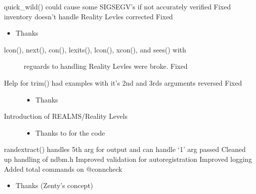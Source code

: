 \documentclass[letterpaper,10pt,english]{sphinxmanual}
\begin{document}
\sphinxAtStartPar
quick\_wild() could cause some SIGSEGV’s if not accurately verified \sphinxhyphen{} Fixed
inventory doesn’t handle Reality Levles corrected \sphinxhyphen{} Fixed
\begin{itemize}
\item {} 
\sphinxAtStartPar
Thanks 

\end{itemize}
\begin{description}
\item[{lcon(), next(), con(), lexits(), lcon(), xcon(), and sees() with}] \leavevmode
\sphinxAtStartPar
reguards to handling Reality Levles were broke. \sphinxhyphen{} Fixed

\item[{Help for trim() had examples with it’s 2nd and 3rds arguments reversed \sphinxhyphen{} Fixed}] \leavevmode\begin{itemize}
\item {} 
\sphinxAtStartPar
Thanks 

\end{itemize}

\end{description}
\begin{description}
\item[{Introduction of REALMS/Reality Levels}] \leavevmode\begin{itemize}
\item {} 
\sphinxAtStartPar
Thanks to  for the code

\end{itemize}

\end{description}

\sphinxAtStartPar
randextract() handles 5th arg for output and can handle ‘1’ arg passed
Cleaned up handling of ndbm.h
Improved validation for autoregistration
Improved logging
Added total commands on @conncheck
\begin{itemize}
\item {} 
\sphinxAtStartPar
Thanks  (Zenty’s concept)

\end{itemize}
\end{document}
